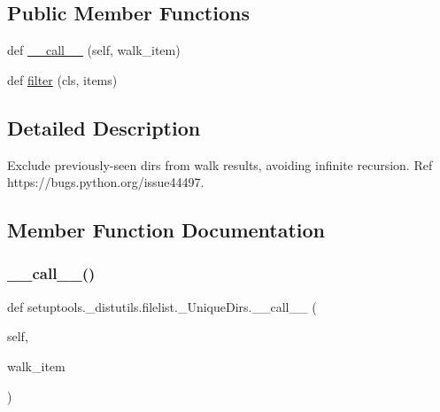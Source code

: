 \subsection*{Public Member Functions}
\begin{DoxyCompactItemize}
\item 
def \hyperlink{classsetuptools_1_1__distutils_1_1filelist_1_1__UniqueDirs_ae80dc73e39650146f7f7853bef88b594}{\+\_\+\+\_\+call\+\_\+\+\_\+} (self, walk\+\_\+item)
\item 
def \hyperlink{classsetuptools_1_1__distutils_1_1filelist_1_1__UniqueDirs_a6d7b48734c3d7d090f60da66f94809cb}{filter} (cls, items)
\end{DoxyCompactItemize}


\subsection{Detailed Description}
\begin{DoxyVerb}Exclude previously-seen dirs from walk results,
avoiding infinite recursion.
Ref https://bugs.python.org/issue44497.
\end{DoxyVerb}
 

\subsection{Member Function Documentation}
\mbox{\label{classsetuptools_1_1__distutils_1_1filelist_1_1__UniqueDirs_ae80dc73e39650146f7f7853bef88b594}} 
\subsubsection{\texorpdfstring{\+\_\+\+\_\+call\+\_\+\+\_\+()}{\_\_call\_\_()}}
{\footnotesize\ttfamily def setuptools.\+\_\+distutils.\+filelist.\+\_\+\+Unique\+Dirs.\+\_\+\+\_\+call\+\_\+\+\_\+ (\begin{DoxyParamCaption}\item[{}]{self,  }\item[{}]{walk\+\_\+item }\end{DoxyParamCaption})}

